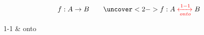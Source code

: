 \begin{frame}{}
  \begin{definition}
    \[
      f: A \to B \qquad \uncover<2->{f: A \red{\;\xleftrightarrow[onto]{1-1}\;} B}
    \]

    \begin{center}
      {1-1 \& onto}
    \end{center}
  \end{definition}
\end{frame}

% 

% 
% 
% 
